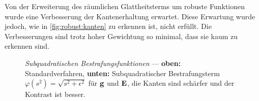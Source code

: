 Von der Erweiterung des räumlichen Glattheitsterms um robuste Funktionen wurde eine Verbesserung der Kantenerhaltung erwartet. Diese Erwartung wurde jedoch, wie in \autoref{fig:robust:kanten} zu erkennen ist, nicht erfüllt. Die Verbesserungen sind trotz hoher Gewichtung so minimal, dass sie kaum zu erkennen sind.


\begin{figure}
  \begin{center}
    
    \caption{\textit{Subquadratischen Bestrafungsfunktionen} --- \textbf{oben:} Standardverfahren, \textbf{unten:} Subquadratischer Bestrafungsterm $\varphi(s^2)=\sqrt{s^2+\epsilon^2}$ für $\mathbf g$ und $\mathbf E$, die Kanten sind schärfer und der Kontrast ist besser.}
    \label{fig:robust:1}
  \end{center}
\end{figure}

